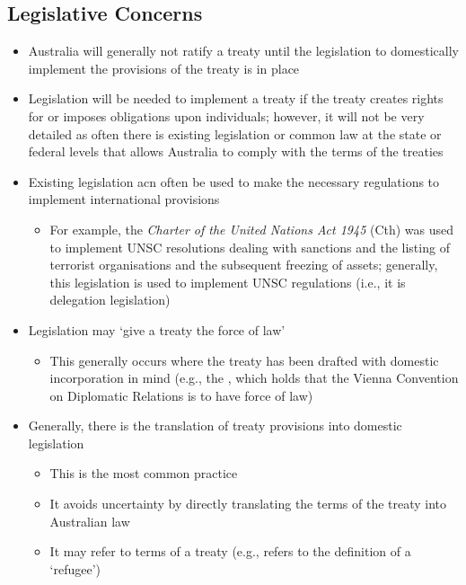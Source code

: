 \subsection{Legislative Concerns}
\begin{itemize}
    \item Australia will generally not ratify a treaty until the legislation to domestically implement the provisions of the treaty is in place
    \item Legislation will be needed to implement a treaty if the treaty creates rights for or imposes obligations upon individuals; however, it will not be very detailed as often there is existing legislation or common law at the state or federal levels that allows Australia to comply with the terms of the treaties
    \item Existing legislation acn often be used to make the necessary regulations to implement international provisions
    \begin{itemize}
        \item For example, the \textit{Charter of the United Nations Act 1945} (Cth) was used to implement UNSC resolutions dealing with sanctions and the listing of terrorist organisations and the subsequent freezing of assets; generally, this legislation is used to implement UNSC regulations (i.e., it is delegation legislation)
    \end{itemize}
    \item Legislation may `give a treaty the force of law'
    \begin{itemize}
        \item This generally occurs where the treaty has been drafted with domestic incorporation in mind (e.g., the , which holds that the Vienna Convention on Diplomatic Relations is to have force of law)
    \end{itemize}
    \item Generally, there is the translation of treaty provisions into domestic legislation
    \begin{itemize}
        \item This is the most common practice
        \item It avoids uncertainty by directly translating the terms of the treaty into Australian law
        \item It may refer to terms of a treaty (e.g.,  refers to the definition of a `refugee')
    \end{itemize}

\end{itemize}
